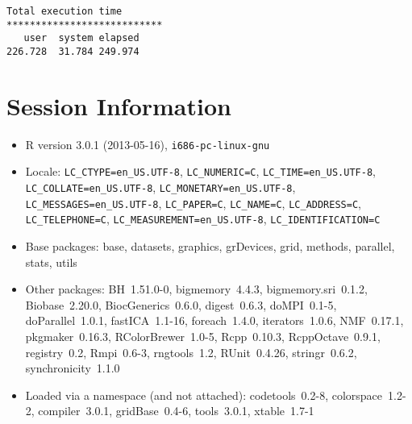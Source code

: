 \documentclass[10pt]{article}\usepackage{graphicx, color}
\begin{document}
\begin{verbatim}
Total execution time
***************************
   user  system elapsed 
226.728  31.784 249.974 

\end{verbatim}

\section*{Session Information}
\begin{itemize}\raggedright
  \item R version 3.0.1 (2013-05-16), \verb|i686-pc-linux-gnu|
  \item Locale: \verb|LC_CTYPE=en_US.UTF-8|, \verb|LC_NUMERIC=C|, \verb|LC_TIME=en_US.UTF-8|, \verb|LC_COLLATE=en_US.UTF-8|, \verb|LC_MONETARY=en_US.UTF-8|, \verb|LC_MESSAGES=en_US.UTF-8|, \verb|LC_PAPER=C|, \verb|LC_NAME=C|, \verb|LC_ADDRESS=C|, \verb|LC_TELEPHONE=C|, \verb|LC_MEASUREMENT=en_US.UTF-8|, \verb|LC_IDENTIFICATION=C|
  \item Base packages: base, datasets, graphics, grDevices, grid,
    methods, parallel, stats, utils
  \item Other packages: BH~1.51.0-0, bigmemory~4.4.3,
    bigmemory.sri~0.1.2, Biobase~2.20.0, BiocGenerics~0.6.0,
    digest~0.6.3, doMPI~0.1-5, doParallel~1.0.1, fastICA~1.1-16,
    foreach~1.4.0, iterators~1.0.6, NMF~0.17.1, pkgmaker~0.16.3,
    RColorBrewer~1.0-5, Rcpp~0.10.3, RcppOctave~0.9.1, registry~0.2,
    Rmpi~0.6-3, rngtools~1.2, RUnit~0.4.26, stringr~0.6.2,
    synchronicity~1.1.0
  \item Loaded via a namespace (and not attached): codetools~0.2-8,
    colorspace~1.2-2, compiler~3.0.1, gridBase~0.4-6, tools~3.0.1,
    xtable~1.7-1
\end{itemize}
\end{document}
